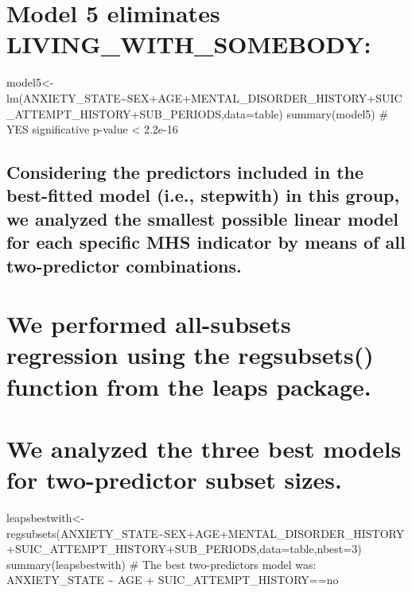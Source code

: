 \documentclass[
]{book}
\begin{document}
\hypertarget{model-5-eliminates-living_with_somebody}{%
\chapter{Model 5 eliminates LIVING\_WITH\_SOMEBODY:}\label{model-5-eliminates-living_with_somebody}}

model5\textless-lm(ANXIETY\_STATE\textasciitilde SEX+AGE+MENTAL\_DISORDER\_HISTORY+SUIC\_ATTEMPT\_HISTORY+SUB\_PERIODS,data=table)
summary(model5)
\# YES significative p-value \textless{} 2.2e-16

\hypertarget{considering-the-predictors-included-in-the-best-fitted-model-i.e.-stepwith-in-this-group-we-analyzed-the-smallest-possible-linear-model-for-each-specific-mhs-indicator-by-means-of-all-two-predictor-combinations.-1}{%
\section{Considering the predictors included in the best-fitted model (i.e., stepwith) in this group, we analyzed the smallest possible linear model for each specific MHS indicator by means of all two-predictor combinations.}\label{considering-the-predictors-included-in-the-best-fitted-model-i.e.-stepwith-in-this-group-we-analyzed-the-smallest-possible-linear-model-for-each-specific-mhs-indicator-by-means-of-all-two-predictor-combinations.-1}}

\hypertarget{we-performed-all-subsets-regression-using-the-regsubsets-function-from-the-leaps-package.-1}{%
\chapter{We performed all-subsets regression using the regsubsets() function from the leaps package.}\label{we-performed-all-subsets-regression-using-the-regsubsets-function-from-the-leaps-package.-1}}

\hypertarget{we-analyzed-the-three-best-models-for-two-predictor-subset-sizes.-1}{%
\chapter{We analyzed the three best models for two-predictor subset sizes.}\label{we-analyzed-the-three-best-models-for-two-predictor-subset-sizes.-1}}

leapsbestwith\textless-regsubsets(ANXIETY\_STATE\textasciitilde SEX+AGE+MENTAL\_DISORDER\_HISTORY+SUIC\_ATTEMPT\_HISTORY+SUB\_PERIODS,data=table,nbest=3)
summary(leapsbestwith)
\# The best two-predictors model was: ANXIETY\_STATE \textasciitilde{} AGE + SUIC\_ATTEMPT\_HISTORY==no
\end{document}
